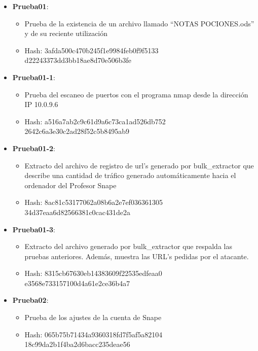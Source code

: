 \begin{itemize}
  \item{\textbf{Prueba01}: 
    \begin{itemize}
      \item{Prueba de la existencia de un archivo llamado ``NOTAS POCIONES.ods'' y de su reciente utilización}
      \item{Hash}: 3afda500c470b245f1e9984feb0f9f5133\\d22243373dd3bb18ae8d70e506b3fe
    \end{itemize}}
  \item{\textbf{Prueba01-1}: 
    \begin{itemize}
      \item{Prueba del escaneo de puertos con el programa nmap desde la dirección \gls{IP} 10.0.9.6}
      \item{Hash}: a516a7ab2c9c61d9a6c73ca1ad526db752\\2642c6a3e30c2ad28f52c5b8495ab9
    \end{itemize}}
  \item{\textbf{Prueba01-2}: 
    \begin{itemize}
      \item{Extracto del archivo de registro de url's generado por bulk\_extractor que describe una cantidad de tráfico generado automáticamente hacia el ordenador del Profesor Snape}
      \item{Hash}: 8ac81c53177062a08b6a2e7ef036361305\\34d37eaa6d82566381c0cac431de2a
    \end{itemize}}
  \item{\textbf{Prueba01-3}: 
    \begin{itemize}
      \item{Extracto del archivo generado por bulk\_extractor que respalda las pruebas anteriores. Además, muestra las URL's pedidas por el atacante.}
      \item{Hash}: 8315cb67630eb14383609f22535edfeaa0\\e3568e733157100d4a61e2ce36b4a7
    \end{itemize}}
  \item{\textbf{Prueba02}: 
    \begin{itemize}
      \item{Prueba de los ajustes de la cuenta de Snape}
      \item{Hash}: 065b75b71434a9360318fd7f5af5a82104\\18c99da2b1f4ba2d6bacc235deae56
    \end{itemize}}

\end{itemize}
